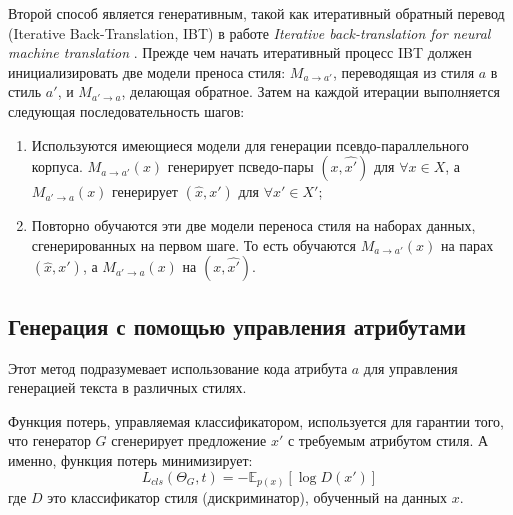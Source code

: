 Второй способ является генеративным, такой как итеративный обратный перевод (Iterative Back-Translation, IBT) в работе \textit{Iterative back-translation for neural machine translation} \cite{hoang-etal-2018-iterative}.
Прежде чем начать итеративный процесс IBT должен инициализировать две модели преноса стиля: $M_{a \rightarrow a'}$, переводящая из стиля $a$ в стиль $a'$, и $M_{a' \rightarrow a}$, делающая обратное.
Затем на каждой итерации выполняется следующая последовательность шагов:
\begin{enumerate}
    \item Используются имеющиеся модели для генерации псевдо-параллельного корпуса.
    $M_{a \rightarrow a'}(x)$ генерирует псведо-пары $(x, \widehat{x'})$ для $\forall x \in X$,
    а $M_{a' \rightarrow a}(x)$ генерирует $(\widehat{x}, x')$ для $\forall x' \in X'$;
    \item Повторно обучаются эти две модели переноса стиля на наборах данных, сгенерированных на первом шаге.
    То есть обучаются $M_{a \rightarrow a'}(x)$ на парах $(\widehat{x}, x')$,
    а $M_{a' \rightarrow a}(x)$ на $(x, \widehat{x'})$.
\end{enumerate}





\subsection{Генерация с помощью управления атрибутами}
Этот метод подразумевает использование кода атрибута $a$ для управления генерацией текста в различных стилях.

Функция потерь, управляемая классификатором, используется для гарантии того, что генератор $G$ сгенерирует предложение $x'$ с требуемым
атрибутом стиля.
А именно, функция потерь минимизирует:
$$
L_{cls}(\Theta_G, t) = -\mathbb{E}_{p(x)} [\log D(x')]
$$
где $D$ это классификатор стиля (дискриминатор), обученный на данных $x$.

